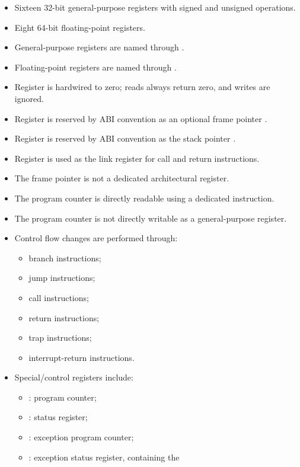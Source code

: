 \begin{itemize}
  \item Sixteen 32-bit general-purpose registers with signed and unsigned
        operations.
  \item Eight 64-bit floating-point registers.
  \item General-purpose registers are named  through .
  \item Floating-point registers are named  through
        .
  \item Register  is hardwired to zero; reads always return zero, and
        writes are ignored.
  \item Register  is reserved by ABI convention as an optional frame
        pointer .
  \item Register  is reserved by ABI convention as the stack pointer
        .
  \item Register  is used as the link register  for call
        and return instructions.
  \item The frame pointer is not a dedicated architectural register.
  \item The program counter is directly readable using a dedicated instruction.
  \item The program counter is not directly writable as a general-purpose
        register.
  \item Control flow changes are performed through:
  \begin{itemize}
    \item branch instructions;
    \item jump instructions;
    \item call instructions;
    \item return instructions;
    \item trap instructions;
    \item interrupt-return instructions.
  \end{itemize}
  \item Special/control registers include:
        \begin{itemize}
        \item {}: program counter;
        \item {}: status register;
        \item {}: exception program counter;
        \item {}: exception status register, containing the

\end{itemize}
\end{itemize}
